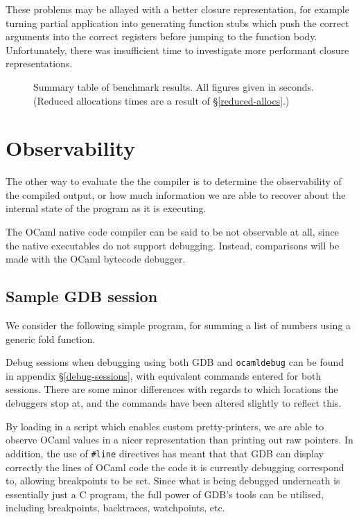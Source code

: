 These problems may be allayed with a better closure representation, for example 
turning partial application into generating function stubs which push the 
correct arguments into the correct registers before jumping to the function 
body. Unfortunately, there was insufficient time to investigate more performant 
closure representations.

\begin{figure}
    \centering
    \resizebox{\textwidth}{!}{
        
    }
    \caption{Summary table of benchmark results. All figures given in 
    seconds. (Reduced allocations times are a result of
    \S\ref{reduced-allocs}.)}
\end{figure}

\section{Observability} \label{observability}

The other way to evaluate the the compiler is to determine the observability of 
the compiled output, or how much information we are able to recover about the 
internal state of the program as it is executing.

The OCaml native code compiler can be said to be not observable at all, since 
the native executables do not support debugging. Instead, comparisons will be 
made with the OCaml bytecode debugger.

\subsection{Sample GDB session}

We consider the following simple program, for summing a list of numbers using a 
generic fold function.



Debug sessions when debugging using both GDB and \texttt{ocamldebug} can be
found in appendix \S\ref{debug-sessions}, with equivalent commands entered
for both sessions. There are some minor differences with regards to which
locations the debuggers stop at, and the commands have been altered slightly to
reflect this.

By loading in a script which enables custom pretty-printers, we are able to 
observe OCaml values in a nicer representation than printing out raw pointers. 
In addition, the use of \texttt{\#}\texttt{line} directives has meant that that 
GDB can display correctly the lines of OCaml code the code it is currently 
debugging correspond to, allowing breakpoints to be set. Since what is being 
debugged underneath is essentially just a C program, the full power of GDB's 
tools can be utilised, including breakpoints, backtraces, watchpoints, etc.

